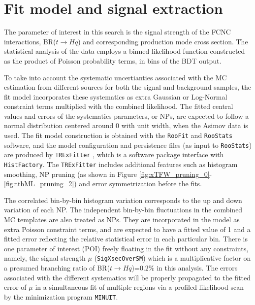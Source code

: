 \section{Fit model and signal extraction}
\label{sec:fit}

The parameter of interest in this search is the signal strength of the FCNC interactions, BR($t\to Hq$) and corresponding production mode cross section. The statistical analysis of the data employs a binned likelihood function constructed as the product of Poisson probability terms, in bins of the BDT output.

To take into account the systematic uncertianties associated with the MC estimation from different sources for both the signal and background samples, the fit model incorporates these systematics as extra Gaussian or Log-Normal constraint terms multiplied with the combined likelihood. The fitted central values and errors of the systematics parameters, or NPs, are expected to follow a normal distribution centered around 0 with unit width, when the Asimov data is used. The fit model construction is obtained with the \texttt{RooFit} and \texttt{RooStats} software, and the model configuration and persistence files (as input to \texttt{RooStats}) are produced by \texttt{TRExFitter} \cite{TRExFitter}, which is a software package interface with \texttt{HistFactory}. The \texttt{TRExFitter} includes additional features such as histogram smoothing, NP pruning (as shown in Figure \ref{fig:xTFW_pruning_0}-\ref{fig:tthML_pruning_2}) and error symmetrization before the fits.

The correlated bin-by-bin histogram variation corresponds to the up and down variation of each NP. The independent bin-by-bin fluctuations in the combined MC templates are also treated as NPs. They are incorporated in the model as extra Poisson constraint terms, and are expected to have a fitted value of 1 and a fitted error reflecting the relative statistical error in each particular bin. There is one parameter of interest (POI) freely floating in the fit without any constraints, namely, the signal strength $\mu$ (\texttt{SigXsecOverSM}) which is a multiplicative factor on a presumed branching ratio of BR($t\to Hq$)=$0.2\%$ in this analysis. The errors associated with the different systematics will be properly propagated to the fitted error of $\mu$ in a simultaneous fit of multiple regions via a profiled likelihood scan by the minimization program \texttt{MINUIT}. 

